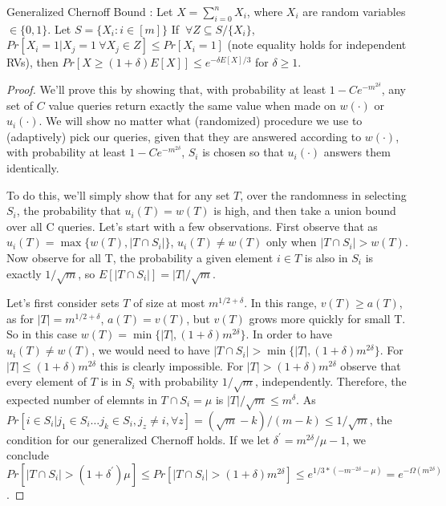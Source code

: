 \begin{theorem} Generalized Chernoff Bound : 
	Let $X = \sum_{i = 0}^{n} X_i$, where $X_i$ are random variables $\in \{0,1\}$. Let $S = \{X_i : i \in [m]\}$ If $\ \forall Z \subseteq S/\{X_i\}$, $Pr[X_i = 1 | X_j = 1 \ \forall  X_j \in Z] \leq Pr[X_i = 1]$ (note equality holds for independent RVs),  then $Pr[X \geq (1+\delta)E[X] ] \leq e^{-\delta E[X] / 3}$ for $\delta \geq 1$.
\end{theorem}
\begin{proof}
We'll prove this by showing that, with probability at least $1 - Ce^{-m^{2\delta}}$, any set of $C$ value queries return exactly the same value when made on $w(\cdot)$ or $u_i(\cdot)$. We will show no matter what (randomized) procedure we use to (adaptively) pick our queries, given that they are answered according to $w(\cdot)$, with probability at least $1 - Ce^{-m^{2\delta}}$, $S_i$ is chosen so that $u_i(\cdot)$ answers them identically.

To do this, we'll simply show that for any set $T$, over the randomness in selecting $S_i$, the probability that $u_i(T) = w(T)$ is high, and then take a union bound over all C queries. Let's start with a few observations. First observe that as $u_i(T) = \max\{w(T), |T \cap S_i|\}$, $u_i(T) \ne w(T)$ only when $|T \cap S_i| > w(T)$. Now observe for all T, the probability a given element $i \in T$ is also in $S_i$ is exactly $1/\sqrt{m}$, so $E[|T \cap S_i|] = |T|/\sqrt{m}$.

Let's first consider sets $T$ of size at most $m^{1/2+\delta}$. In this range, $v(T) \geq a(T)$, as for $|T| = m^{1/2+\delta}$, $a(T) = v(T)$, but $v(T)$ grows more quickly for small T. So in this case $w(T) = \min\{|T|, (1+\delta)m^{2\delta}\}$. In order to have $u_i(T) \neq w(T)$, we would need to have $|T\cap S_i| > \min\{|T|, (1+\delta)m^{2\delta}\}$. For $|T| \leq (1+\delta)m^{2\delta}$ this is clearly impossible. For $|T| > (1+\delta)m^{2\delta}$ observe that every element of $T$ is in $S_i$ with probability $1/\sqrt{m}$, independently. Therefore, the expected number of elemnts in $T \cap S_i = \mu$ is $|T|/\sqrt{m} \leq m^{\delta}$. 
As $Pr[i \in S_i | j_1 \in S_i \ldots j_k \in S_i, j_z \ne i, \forall z] = (\sqrt{m} - k) / (m - k) \leq 1/\sqrt{m}$, the condition for our generalized Chernoff holds. If we let $\delta^{'} = m^{2 \delta}/\mu - 1$, we conclude $Pr[|T \cap S_i| > (1+\delta^{'})\mu] \leq Pr[|T \cap S_i| > (1+\delta)m^{2\delta} ] \leq e^{1/3 * (-m^{-2\delta} - \mu)} = e^{-\Omega(m^{2\delta})}$.


\end{proof}
